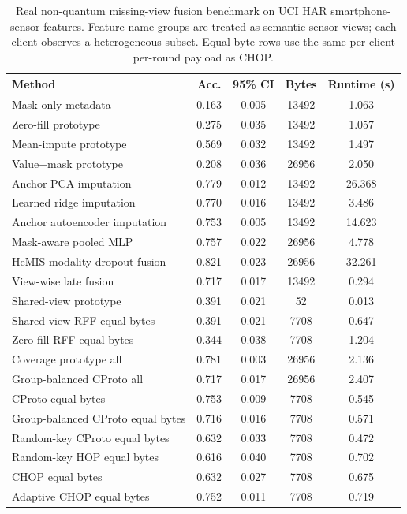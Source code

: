 \documentclass[preprint]{elsarticle}
\renewcommand{\arraystretch}{1.08}
\begin{document}
\begin{table}[t]
\centering
\caption{Real non-quantum missing-view fusion benchmark on UCI HAR smartphone-sensor features. Feature-name groups are treated as semantic sensor views; each client observes a heterogeneous subset. Equal-byte rows use the same per-client per-round payload as CHOP.}
\label{tab:if-nonquantum-fusion}
\scriptsize
\setlength{\tabcolsep}{3pt}
\renewcommand{\arraystretch}{0.94}
\begin{tabular}{lcccc}
\toprule
Method & Acc. & 95\% CI & Bytes & Runtime (s) \\
\midrule
Mask-only metadata & 0.163 & 0.005 & 13492 & 1.063 \\
Zero-fill prototype & 0.275 & 0.035 & 13492 & 1.057 \\
Mean-impute prototype & 0.569 & 0.032 & 13492 & 1.497 \\
Value+mask prototype & 0.208 & 0.036 & 26956 & 2.050 \\
Anchor PCA imputation & 0.779 & 0.012 & 13492 & 26.368 \\
Learned ridge imputation & 0.770 & 0.016 & 13492 & 3.486 \\
Anchor autoencoder imputation & 0.753 & 0.005 & 13492 & 14.623 \\
Mask-aware pooled MLP & 0.757 & 0.022 & 26956 & 4.778 \\
HeMIS modality-dropout fusion & 0.821 & 0.023 & 26956 & 32.261 \\
View-wise late fusion & 0.717 & 0.017 & 13492 & 0.294 \\
Shared-view prototype & 0.391 & 0.021 & 52 & 0.013 \\
Shared-view RFF equal bytes & 0.391 & 0.021 & 7708 & 0.647 \\
Zero-fill RFF equal bytes & 0.344 & 0.038 & 7708 & 1.204 \\
Coverage prototype all & 0.781 & 0.003 & 26956 & 2.136 \\
Group-balanced CProto all & 0.717 & 0.017 & 26956 & 2.407 \\
CProto equal bytes & 0.753 & 0.009 & 7708 & 0.545 \\
Group-balanced CProto equal bytes & 0.716 & 0.016 & 7708 & 0.571 \\
Random-key CProto equal bytes & 0.632 & 0.033 & 7708 & 0.472 \\
Random-key HOP equal bytes & 0.616 & 0.040 & 7708 & 0.702 \\
CHOP equal bytes & 0.632 & 0.027 & 7708 & 0.675 \\
Adaptive CHOP equal bytes & 0.752 & 0.011 & 7708 & 0.719 \\
\bottomrule
\end{tabular}
\end{table}
\end{document}

